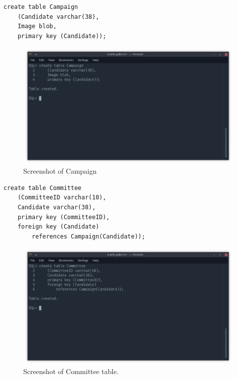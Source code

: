 \documentclass[12pt]{article}
\begin{document}
\begin{verbatim}
create table Campaign
    (Candidate varchar(38),
    Image blob,
    primary key (Candidate));
\end{verbatim}
    \begin{figure}[H]
        \begin{center}
        \includegraphics[scale=.40]{campaign}
        \caption{Screenshot of Campaign}
        \label{fig:campaign}
        \end{center}
    \end{figure}
\begin{verbatim}
create table Committee
    (CommitteeID varchar(10),
    Candidate varchar(38),
    primary key (CommitteeID),
    foreign key (Candidate) 
        references Campaign(Candidate));
\end{verbatim}
    \begin{figure}[H]
        \begin{center}
        \includegraphics[scale=.40]{committee}
        \caption{Screenshot of Committee table.}
        \label{fig:committee}
        \end{center}
    \end{figure}
\end{document}
